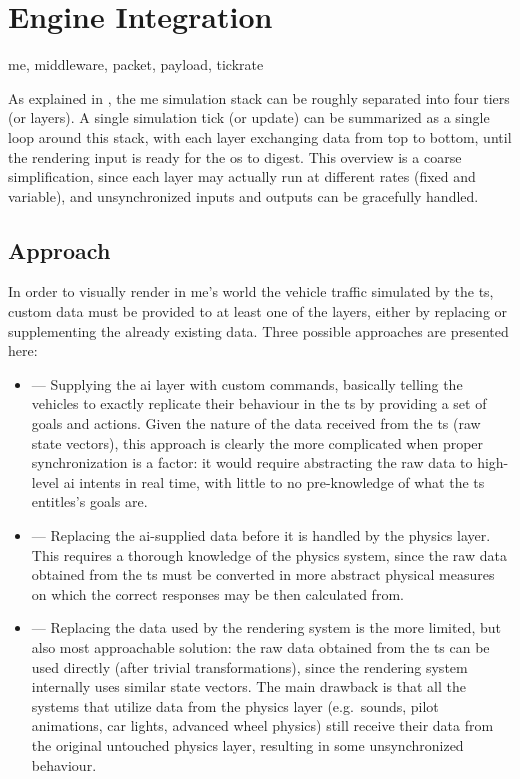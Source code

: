 \chapter{Engine Integration}\label{ch:integration}

\begin{keywords}
	me, middleware, packet, payload, tickrate
\end{keywords}

As explained in , the \gls{me} simulation stack can be roughly separated into four tiers (or layers). A single simulation tick (or update) can be summarized as a single loop around this stack, with each layer exchanging data from top to bottom, until the rendering input is ready for the \gls{os} to digest. This overview is a coarse simplification, since each layer may actually run at different rates (fixed and variable), and unsynchronized inputs and outputs can be gracefully handled.

\section{Approach}\label{sc:integration:approach}

In order to visually render in \gls{me}'s world the vehicle traffic simulated by the \gls{ts}, custom data must be provided to at least one of the layers, either by replacing or supplementing the already existing data. Three possible approaches are presented here:

\begin{itemize}
	\item {} --- Supplying the \gls{ai} layer with custom commands, basically telling the vehicles to exactly replicate their behaviour in the \gls{ts} by providing a set of goals and actions. Given the nature of the data received from the \gls{ts} (raw state vectors), this approach is clearly the more complicated when proper synchronization is a factor: it would require abstracting the raw data to high-level \gls{ai} intents in real time, with little to no pre-knowledge of what the \gls{ts} entitles's goals are.
	\item {} --- Replacing the \gls{ai}-supplied data before it is handled by the physics layer. This requires a thorough knowledge of the physics system, since the raw data obtained from the \gls{ts} must be converted in more abstract physical measures on which the correct responses may be then calculated from.
	\item {} --- Replacing the data used by the rendering system is the more limited, but also most approachable solution: the raw data obtained from the \gls{ts} can be used directly (after trivial transformations), since the rendering system internally uses similar state vectors. The main drawback is that all the systems that utilize data from the physics layer (e.g.\ sounds, pilot animations, car lights, advanced wheel physics) still receive their data from the original untouched physics layer, resulting in some unsynchronized behaviour.
\end{itemize}


